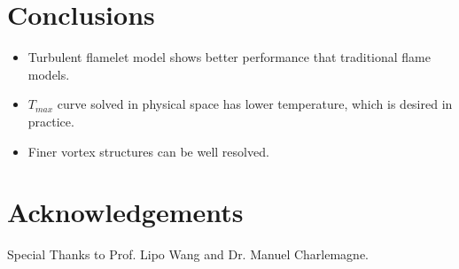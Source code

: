 \documentclass[a0,portrait]{a0poster}
\begin{document}
\begin{multicols}{2}
\vspace{-2cm}
\color{SaddleBrown} %
\section*{Conclusions}
	\color{DarkSlateGray}
	\begin{itemize}
	    \item
	    	Turbulent flamelet model shows better performance that traditional flame models.
	    \item
	    	$T_{max}$ curve solved in physical space has lower temperature, which is desired in practice.
	    \item 
	    	Finer vortex structures can be well resolved.
	    \vspace{10pt}
	\end{itemize}%

\nocite{*} %
\printbibliography

\section*{Acknowledgements}
	Special Thanks to Prof. Lipo Wang and Dr. Manuel Charlemagne. 

\end{multicols}
\end{document}
